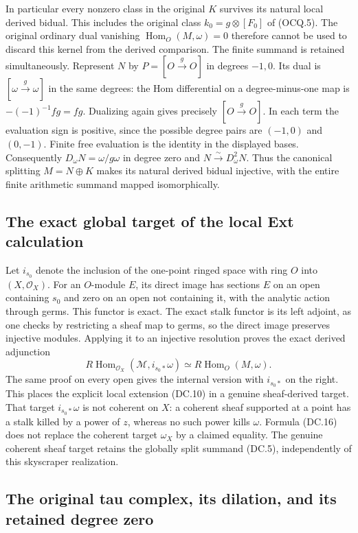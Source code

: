 In particular every nonzero class in the original $K$ survives its
natural local derived bidual.  This includes the original class
$k_0=g\otimes[F_0]$ of (OCQ.5).  The original ordinary dual
vanishing $\operatorname{Hom}_O(M,\omega)=0$ therefore cannot be
used to discard this kernel from the derived comparison.
The finite summand is retained simultaneously.  Represent $N$ by
$P=[O\xrightarrow{g}O]$ in degrees $-1,0$.  Its dual is
$[\omega\xrightarrow{g}\omega]$ in the same degrees: the Hom
differential on a degree-minus-one map is $-(-1)^{-1}fg=fg$.
Dualizing again gives precisely $[O\xrightarrow{g}O]$.
In each term the evaluation sign is positive, since the possible
degree pairs are $(-1,0)$ and $(0,-1)$.  Finite free evaluation
is the identity in the displayed bases.  Consequently
$D_\omega N=\omega/g\omega$ in degree zero and
$N\xrightarrow{\sim}D_\omega^2N$.  Thus the canonical splitting
$M=N\oplus K$ makes its natural derived bidual injective, with
the entire finite arithmetic summand mapped isomorphically.

\subsection{The exact global target of the local Ext calculation}

Let $i_{s_0}$ denote the inclusion of the one-point ringed space with
ring $O$ into $(X,\mathcal O_X)$.  For an $O$-module $E$, its
direct image has sections $E$ on an open containing $s_0$ and zero
on an open not containing it, with the analytic action through germs.
This functor is exact.  The exact stalk functor is its left adjoint,
as one checks by restricting a sheaf map to germs, so the direct
image preserves injective modules.  Applying it to an injective
resolution proves the exact derived adjunction
\[
 R\operatorname{Hom}_{\mathcal O_X}(\mathcal M,i_{s_0*}\omega)
 \simeq R\operatorname{Hom}_O(M,\omega).
 \tag{DC.16}
\]
The same proof on every open gives the internal version with
$i_{s_0*}$ on the right.  This places the explicit local extension
(DC.10) in a genuine sheaf-derived target.  That target
$i_{s_0*}\omega$ is not coherent on $X$: a coherent sheaf supported
at a point has a stalk killed by a power of $z$, whereas no such
power kills $\omega$.  Formula (DC.16) does not replace the
coherent target $\omega_X$ by a claimed equality.  The genuine
coherent sheaf target retains the globally split summand (DC.5),
independently of this skyscraper realization.

\subsection{The original tau complex, its dilation, and its retained degree zero}

